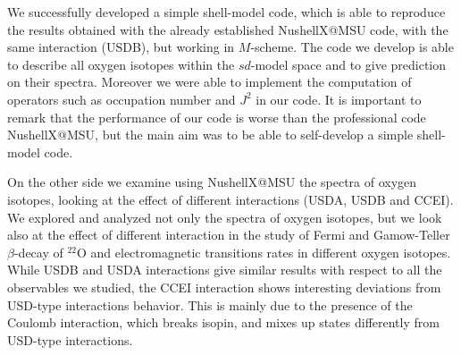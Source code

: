 We successfully developed a simple shell-model code, which is able to reproduce the results obtained with the already established NushellX@MSU code,  with the same interaction (USDB), but working in $M$-scheme.
The code we develop is able to describe all oxygen isotopes within the $sd$-model space and to give prediction on their spectra. Moreover we were able to implement the computation of operators such as occupation number and $J^2$ in our code.
It is important to remark that the performance of our code is worse than the professional code NushellX@MSU, but the main aim was to be able to self-develop a simple shell-model code.

On the other side we examine using NushellX@MSU the spectra of oxygen isotopes, looking at the effect of different interactions (USDA, USDB and CCEI).
We explored and analyzed not only the spectra of oxygen isotopes, but we look also at the effect of different interaction in the study of Fermi and Gamow-Teller $\beta$-decay of $^{22}$O and electromagnetic transitions rates in different oxygen isotopes.
While USDB and USDA interactions give  similar results with respect to all the observables we studied, the CCEI interaction shows interesting deviations from USD-type interactions behavior.
This is mainly due to the presence of the Coulomb interaction, which breaks isopin, and mixes up states differently from USD-type interactions.
